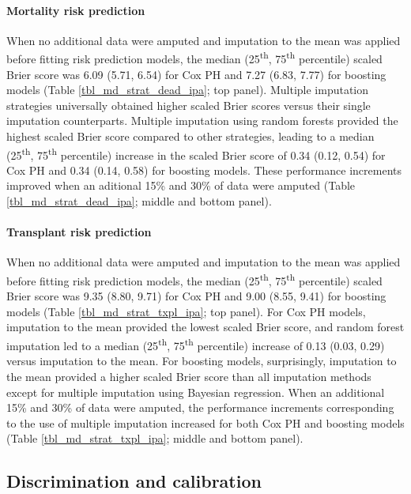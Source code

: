 \documentclass{article}
\begin{document}
\paragraph{Mortality risk prediction}

When no additional data were amputed and imputation to the mean was
applied before fitting risk prediction models, the median
(25\textsuperscript{th}, 75\textsuperscript{th} percentile) scaled Brier
score was 6.09 (5.71, 6.54) for Cox PH and 7.27 (6.83, 7.77) for
boosting models (Table \ref{tbl_md_strat_dead_ipa}; top panel). Multiple
imputation strategies universally obtained higher scaled Brier scores
versus their single imputation counterparts. Multiple imputation using
random forests provided the highest scaled Brier score compared to other
strategies, leading to a median (25\textsuperscript{th},
75\textsuperscript{th} percentile) increase in the scaled Brier score of
0.34 (0.12, 0.54) for Cox PH and 0.34 (0.14, 0.58) for boosting models.
These performance increments improved when an aditional 15\% and 30\% of
data were amputed (Table \ref{tbl_md_strat_dead_ipa}; middle and bottom
panel).

\paragraph{Transplant risk prediction}

When no additional data were amputed and imputation to the mean was
applied before fitting risk prediction models, the median
(25\textsuperscript{th}, 75\textsuperscript{th} percentile) scaled Brier
score was 9.35 (8.80, 9.71) for Cox PH and 9.00 (8.55, 9.41) for
boosting models (Table \ref{tbl_md_strat_txpl_ipa}; top panel). For Cox
PH models, imputation to the mean provided the lowest scaled Brier
score, and random forest imputation led to a median
(25\textsuperscript{th}, 75\textsuperscript{th} percentile) increase of
0.13 (0.03, 0.29) versus imputation to the mean. For boosting models,
surprisingly, imputation to the mean provided a higher scaled Brier
score than all imputation methods except for multiple imputation using
Bayesian regression. When an additional 15\% and 30\% of data were
amputed, the performance increments corresponding to the use of multiple
imputation increased for both Cox PH and boosting models (Table
\ref{tbl_md_strat_txpl_ipa}; middle and bottom panel).

\hypertarget{discrimination-and-calibration}{%
\subsection{Discrimination and
calibration}\label{discrimination-and-calibration}}
\end{document}
